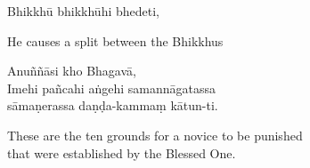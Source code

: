 Bhikkhū bhikkhūhi bhedeti,

\begin{english}
  He causes a split between the Bhikkhus
\end{english}

Anuññāsi kho Bhagavā,\\
Imehi pañcahi aṅgehi samannāgatassa\\
sāmaṇerassa daṇḍa-kammaṃ kātun-ti.

\begin{english}
  These are the ten grounds for a novice to be punished\\
  that were established by the Blessed One.
\end{english}



